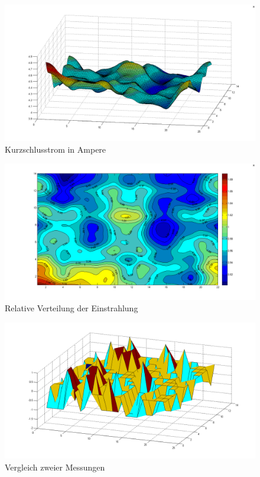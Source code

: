 \documentclass[a4paper,bibtotoc,oneside]{scrbook}
\begin{document}
\begin{figure}[htbp]
\centering
\includegraphics[width=150mm]{img/hugel.png}
\caption[Kurzschlusstrom in Ampere]{Kurzschlusstrom in Ampere}\label{hugel}
\end{figure}



\begin{figure}[htbp]
\centering
\includegraphics[width=150mm]{img/karte1.png}
\caption[Relative Verteilung der Einstrahlung]{Relative Verteilung der Einstrahlung}\label{karte1}
\end{figure}

\begin{figure}[htbp]
\centering
\includegraphics[width=150mm]{img/vergleich23.png}
\caption{Vergleich zweier Messungen}\label{vergleich}
\end{figure}
\end{document}

